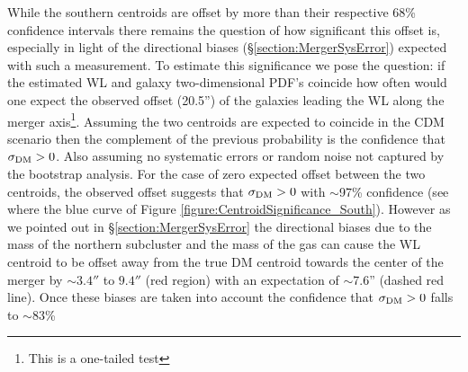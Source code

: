 While the southern centroids are offset by more than their respective 68\% confidence intervals there remains the question of how significant this offset is, especially in light of the directional biases (\S\ref{section:MergerSysError}) expected with such a measurement.
To estimate this significance we pose the question:
if the estimated WL and galaxy two-dimensional PDF's coincide how often would one expect the observed offset (20.5'') of the galaxies leading the WL along the merger axis\footnote{This is a one-tailed test}.
Assuming the two centroids are expected to coincide in the CDM scenario then the complement of the previous probability is the confidence that $\sigma_{\rm DM}>0$.
Also assuming no systematic errors or random noise not captured by the bootstrap analysis.
For the case of zero expected offset between the two centroids, the observed offset suggests that $\sigma_{\rm DM}>0$ with $\sim$97\% confidence (see where the blue curve of Figure \ref{figure:CentroidSignificance_South}).
However as we pointed out in \S\ref{section:MergerSysError} the directional biases due to the mass of the northern subcluster and the mass of the gas can cause the WL centroid to be offset away from the true DM centroid towards the center of the merger by $\sim3.4''$ to $9.4''$ (red region) with an expectation of $\sim$7.6'' (dashed red line).
Once these biases are taken into account the confidence that $\sigma_{\rm DM}>0$ falls to $\sim$83\%

